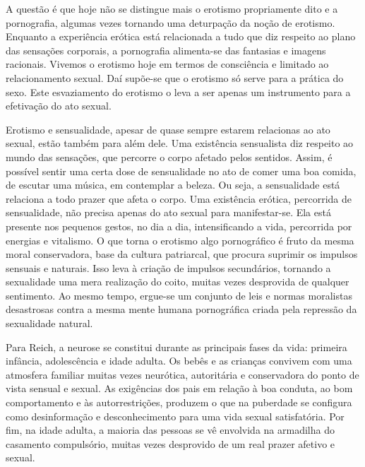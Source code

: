 A questão é que hoje não se distingue mais o erotismo propriamente dito
e a pornografia, algumas vezes tornando uma deturpação da noção de
erotismo. Enquanto a experiência erótica está relacionada a tudo que diz
respeito ao plano das sensações corporais, a pornografia alimenta-se das
fantasias e imagens racionais. Vivemos o erotismo hoje em termos de
consciência e limitado ao relacionamento sexual. Daí supõe-se que o
erotismo só serve para a prática do sexo. Este esvaziamento do erotismo
o leva a ser apenas um instrumento para a efetivação do ato sexual.

Erotismo e sensualidade, apesar de quase sempre estarem relacionas ao
ato sexual, estão também para além dele. Uma existência sensualista diz
respeito ao mundo das sensações, que percorre o corpo afetado pelos
sentidos. Assim, é possível sentir uma certa dose de sensualidade no ato
de comer uma boa comida, de escutar uma música, em contemplar a beleza.
Ou seja, a sensualidade está relaciona a todo prazer que afeta o corpo.
Uma existência erótica, percorrida de sensualidade, não precisa apenas
do ato sexual para manifestar-se. Ela está presente nos pequenos gestos,
no dia a dia, intensificando a vida, percorrida por energias e
vitalismo. O que torna o erotismo algo pornográfico é fruto da mesma
moral conservadora, base da cultura patriarcal, que procura suprimir os
impulsos sensuais e naturais. Isso leva à criação de impulsos
secundários, tornando a sexualidade uma mera realização do coito, muitas
vezes desprovida de qualquer sentimento. Ao mesmo tempo, ergue-se um
conjunto de leis e normas moralistas desastrosas contra a mesma mente
humana pornográfica criada pela repressão da sexualidade natural.

Para Reich, a neurose se constitui durante as principais fases da vida:
primeira infância, adolescência e idade adulta. Os bebês e as crianças
convivem com uma atmosfera familiar muitas vezes neurótica, autoritária
e conservadora do ponto de vista sensual e sexual. As exigências dos
pais em relação à boa conduta, ao bom comportamento e às
autorrestrições, produzem o que na puberdade se configura como
desinformação e desconhecimento para uma vida sexual satisfatória. Por
fim, na idade adulta, a maioria das pessoas se vê envolvida na armadilha
do casamento compulsório, muitas vezes desprovido de um real prazer
afetivo e sexual.


